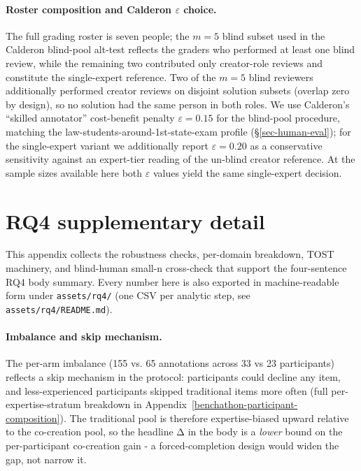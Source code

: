 \documentclass[11pt]{article}
\begin{document}
\paragraph{Roster composition and Calderon $\varepsilon$ choice.} The
full grading roster is seven people; the \(m=5\) blind subset used in
the Calderon blind-pool alt-test reflects the graders who performed at
least one blind review, while the remaining two contributed only
creator-role reviews and constitute the single-expert reference. Two of
the \(m=5\) blind reviewers additionally performed creator reviews on
disjoint solution subsets (overlap zero by design), so no solution had
the same person in both roles. We use Calderon's ``skilled annotator''
cost-benefit penalty \(\varepsilon=0.15\) for the blind-pool procedure,
matching the law-students-around-1st-state-exam profile
(§\ref{sec-human-eval}); for the single-expert variant we additionally
report \(\varepsilon=0.20\) as a conservative sensitivity against an
expert-tier reading of the un-blind creator reference. At the sample
sizes available here both \(\varepsilon\) values yield the same
single-expert decision.

\section{RQ4 supplementary detail}\label{rq4-supplementary}

This appendix collects the robustness checks, per-domain breakdown, TOST
machinery, and blind-human small-n cross-check that support the
four-sentence RQ4 body summary. Every number here is also exported in
machine-readable form under \texttt{assets/rq4/} (one CSV per analytic
step, see \texttt{assets/rq4/README.md}).

\paragraph{Imbalance and skip mechanism.} The per-arm imbalance (155 vs.
65 annotations across 33 vs 23 participants) reflects a skip mechanism
in the protocol: participants could decline any item, and
less-experienced participants skipped traditional items more often (full
per-expertise-stratum breakdown in
Appendix~\ref{benchathon-participant-composition}). The traditional pool
is therefore expertise-biased upward relative to the co-creation pool,
so the headline Δ in the body is a \emph{lower} bound on the
per-participant co-creation gain - a forced-completion design would
widen the gap, not narrow it.
\end{document}
